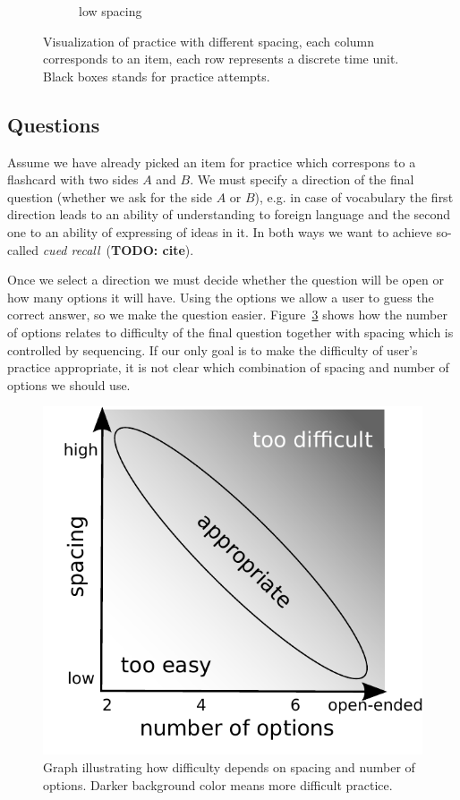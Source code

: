 \documentclass[table,color]{fithesis3/fithesis3}
\begin{document}
\begin{figure}
\begin{subfigure}[b]{.5\textwidth}
		\caption{low spacing}
		\label{figure:practice_progress_b}
	\end{subfigure}
	\caption{Visualization of practice with different spacing, each column
		corresponds to an item, each row represents a discrete time unit. Black
		boxes stands for practice attempts.}
	\label{figure:practice_progress}
\end{figure}

\subsection{Questions}

Assume we have already picked an item for practice which correspons to a
flashcard with two sides $A$ and $B$. We must specify a direction of the final
question (whether we ask for the side $A$ or $B$), e.g. in case of vocabulary
the first direction leads to an ability of understanding to foreign language
and the second one to an ability of expressing of ideas in it. In both ways we
want to achieve so-called \emph{cued recall}~(\textbf{TODO: cite}).

Once we select a direction we must decide whether the question will be
open or how many options it will have. Using the options we allow a user
to guess the correct answer, so we make the question easier.
Figure~\ref{figure:options_vs_spacing} shows how the number of options relates
to difficulty of the final question together with spacing which is controlled
by sequencing. If our only goal is to make the difficulty of user's practice
appropriate, it is not clear which combination of spacing and number of options
we should use.

\begin{figure}[h]
	\begin{center}
		\includegraphics[width=.5\textwidth]{figure/options_vs_spacing}
	\end{center}
	\caption{Graph illustrating how difficulty depends on spacing and number of
		options. Darker background color means more difficult practice.}
	\label{figure:options_vs_spacing}
\end{figure}
\end{document}

